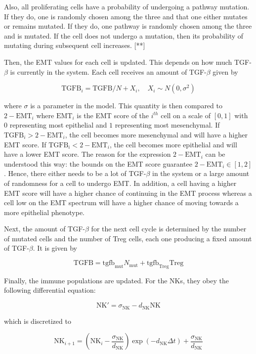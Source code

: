 \documentclass{article}
\begin{document}
Also, all proliferating cells have a probability of undergoing a pathway mutation.
If they do, one is randomly chosen among the three and that one either mutates or remains mutated.
If they do, one pathway is randomly chosen among the three and is mutated.
If the cell does not undergo a mutation, then its probability of mutating during subsequent cell increases. [**]

Then, the EMT values for each cell is updated.
This depends on how much TGF-$\beta$ is currently in the system.
Each cell receives an amount of TGF-$\beta$ given by

$$ \text{TGFB}_i = \text{TGFB}/N + X_i, \quad X_i \sim N(0,\sigma^2)  $$

where $\sigma$ is a parameter in the model.
This quantity is then compared to $2-\text{EMT}_i$ where $\text{EMT}_i$ is the EMT score of the $i^{th}$ cell on a scale of $[0,1]$ with $0$ representing most epithelial and $1$ representing most mesenchymal.
If $\text{TGFB}_i>2-\text{EMT}_i$, the cell becomes more mesenchymal and will have a higher EMT score.
If $\text{TGFB}_i<2-\text{EMT}_i$, the cell becomes more epithelial and will have a lower EMT score.
The reason for the expression $2-\text{EMT}_i$ can be understood this way: 
the bounds on the EMT score guarantee $2-\text{EMT}_i\in[1,2]$.
Hence, there either needs to be a lot of TGF-$\beta$ in the system or a large amount of randomness for a cell to undergo EMT.
In addition, a cell having a higher EMT score will have a higher chance of continuing in the EMT process whereas a cell low on the EMT spectrum will have a higher chance of moving towards a more epithelial phenotype.

Next, the amount of TGF-$\beta$ for the next cell cycle is determined by the number of mutated cells and the number of Treg cells, each one producing a fixed amount of TGF-$\beta$. It is given by

$$ \text{TGFB} = \text{tgfb}_{\text{mut}}N_{\text{mut}} + \text{tgfb}_{\text{Treg}}\text{Treg}$$

Finally, the immune populations are updated.
For the NKs, they obey the following differential equation:
 
$$ \text{NK}' = \sigma_{\text{NK}} - d_{\text{NK}}\text{NK} $$

which is discretized to

$$ \text{NK}_{i+1} = \left (\text{NK}_i-\frac{\sigma_{\text{NK}}}{d_{\text{NK}}} \right )\exp(-d_{\text{NK}}\Delta t)+\frac{\sigma_{\text{NK}}}{d_{\text{NK}}} $$
\end{document}
